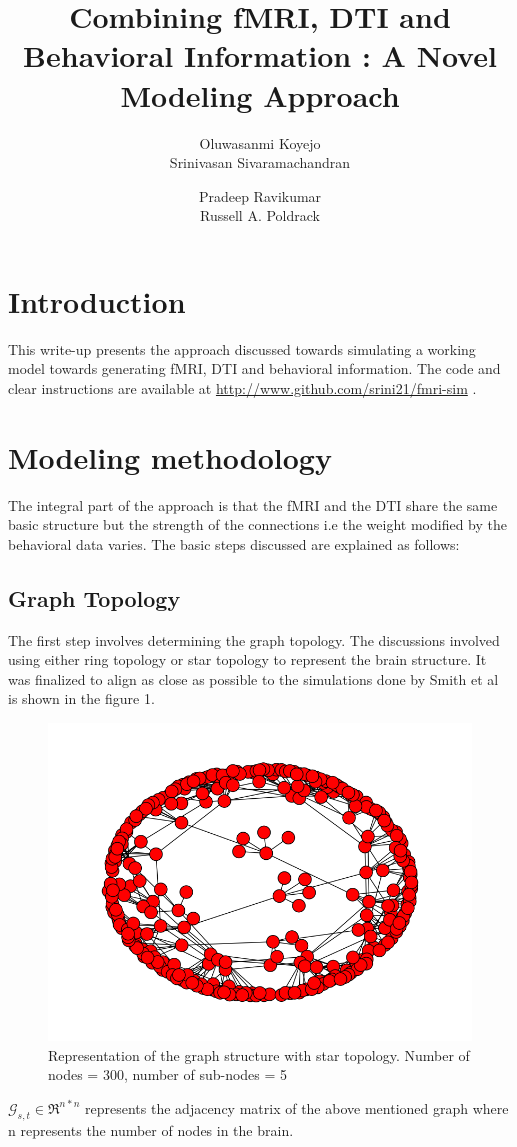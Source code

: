 \documentclass[a4paper,10pt]{article}
\author{
  Oluwasanmi Koyejo\\
  Srinivasan Sivaramachandran
  \and
  Pradeep Ravikumar\\
  Russell A. Poldrack
}
\title{Combining fMRI, DTI and Behavioral Information : A Novel Modeling Approach}
\begin{document}
\maketitle



\section{Introduction}
This write-up presents the approach discussed towards simulating a working model towards generating fMRI, DTI and behavioral information. The code and clear instructions are available at \url{http://www.github.com/srini21/fmri-sim} .

\section{Modeling methodology}
The integral part of the approach is that the fMRI and the DTI share the same basic structure but the strength of the connections i.e the weight modified by the behavioral data varies. The basic steps discussed are explained as follows: 

\subsection{Graph Topology}
The first step involves determining the graph topology. The discussions involved using either ring topology or star topology to represent the brain structure. It was finalized to align as close as possible to the simulations done by Smith et  al \cite{smith} is shown in the figure 1.  
\begin{figure}[b]
\center
\includegraphics[scale=0.3]{graphRep.png}

\caption{Representation of the graph structure with star topology. Number of nodes = 300, number of sub-nodes = 5}

\end{figure}
$\mathcal{G}_{s,t} \in \Re^{n*n}$ represents the adjacency matrix of the above mentioned graph where n represents the number of nodes in the brain.
\end{document}
